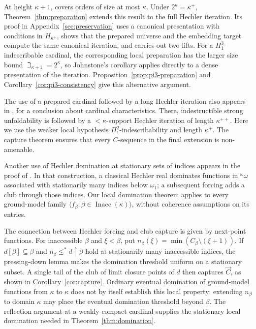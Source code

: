 \documentclass[10pt,a4paper]{amsart}
\theoremstyle{definition}
\theoremstyle{remark}
\DeclareMathOperator{\Inacc}{Inacc}
\begin{document}
At height \(\kappa+1\), \cite[Corollary 38]{Johnstone} covers
orders of size at most \(\kappa\). Under \(2^\kappa=\kappa^+\),
Theorem~\ref{thm:preparation} extends this result to the full
Hechler iteration. Its proof in Appendix~\ref{sec:preservation}
uses a canonical presentation with conditions in \(H_{\kappa^+}\),
shows that the prepared universe and the embedding target
compute the same canonical iteration, and carries out two lifts.
For a \(\Pi^3_1\)-indescribable cardinal, the corresponding
local preparation has the larger size bound
\(\beth_{\kappa+1}=2^\kappa\), so Johnstone's corollary
applies directly to a dense presentation of the iteration.
Proposition~\ref{prop:pi3-preparation} and
Corollary~\ref{cor:pi3-consistency} give this alternative argument.

The use of a prepared cardinal followed by a long
Hechler iteration also appears in
\cite[Theorem 4.7]{Schuerz}, for a conclusion about
cardinal characteristics. There, indestructible strong
unfoldability is followed by a \(<\kappa\)-support
Hechler iteration of length \(\kappa^{++}\).
Here we use the weaker local hypothesis
\(\Pi^2_1\)-indescribability and length
\(\kappa^+\). The capture theorem ensures that every
\(C\)-sequence in the final extension is non-amenable.

Another use of Hechler domination at stationary sets of indices appears in
the proof of \cite[Lemma 20]{LL}.
In that construction, a classical Hechler real dominates
functions in \({}^\omega\omega\) associated with stationarily
many indices below \(\omega_1\); a subsequent forcing adds a
club through those indices. Our local domination theorem applies
to every ground-model family
\(\langle f_\beta:\beta\in\Inacc(\kappa)\rangle\),
without coherence assumptions on its entries.

The connection between Hechler forcing and club capture is
given by next-point functions. For inaccessible \(\beta\)
and \(\xi<\beta\), put
\(n_\beta(\xi)=\min(C_\beta\setminus(\xi+1))\).
If \(d[\beta]\subseteq\beta\) and
\(n_\beta\leq^*d\restriction\beta\) hold at stationarily
many inaccessible indices, the pressing-down lemma makes the domination
threshold uniform on a stationary subset. A single tail of the
club of limit closure points of \(d\) then captures \(\vec C\),
as shown in Corollary~\ref{cor:capture}. Ordinary eventual
domination of ground-model functions from \(\kappa\) to \(\kappa\)
does not by itself establish this local property: extending
\(n_\beta\) to domain \(\kappa\) may place the eventual
domination threshold beyond \(\beta\). The reflection argument
at a weakly compact cardinal supplies the stationary local
domination needed in Theorem~\ref{thm:domination}.
\end{document}

